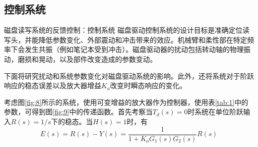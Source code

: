 \documentclass[handout,cjkutf8,table,aspectratio=1610]{beamer} %
\begin{document}
\subsection{控制系统}
\begin{frame}{磁盘读写系统的反馈控制：控制系统}
磁盘驱动控制系统的设计目标是准确定位读写头，并能降低参数变化、外部震动和冲击带来的效应。机械臂和柔性部在特定频率下会发生共振（例如笔记本受到冲击）。磁盘驱动器的扰动包括转动轴的物理振动，磨损和晃动，以及部件改变造成的参数变动。

下面将研究扰动和系统参数变化对磁盘驱动系统的影响。此外，还将系统对于阶跃响应的稳态误差以及放大器增益$K_a$改变时瞬态响应的变化。

考虑图\ref{fig:8}所示的系统，使用可变增益的放大器作为控制器，使用表\ref{tab:1}中的参数，可得到图\ref{fig:9}中的传递函数。首先考察当$T_d(s)=0$时系统在单位阶跃输入$R(s)=1/s$下的稳态。当$H(s)=1$时，有
$$E(s)=R(s)-Y(s)=\frac{1}{1+K_aG_1(s)G_2(s)}R(s)$$
\end{frame}
\end{document}
